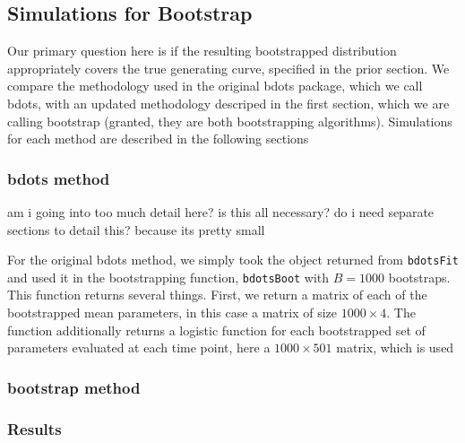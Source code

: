 \documentclass{article}
\begin{document}
\subsection{Simulations for Bootstrap}

Our primary question here is if the resulting bootstrapped distribution appropriately covers the true generating curve, specified in the prior section. We compare the methodology used in the original bdots package, which we call bdots, with an updated methodology descriped in the first section, which we are calling bootstrap (granted, they are both bootstrapping algorithms). Simulations for each method are described in the following sections

\subsubsection{bdots method}

am i going into too much detail here? is this all necessary? do i need separate sections to detail this? because its pretty small

For the original bdots method, we simply took the object returned from \texttt{bdotsFit} and used it in the bootstrapping function, \texttt{bdotsBoot} with $B = 1000$ bootstraps. This function returns several things. First, we return a matrix of each of the bootstrapped mean parameters, in this case a matrix of size $1000 \times 4$. The function additionally returns a logistic function for each bootstrapped set of parameters evaluated at each time point, here a $1000 \times 501$ matrix, which is used



\subsubsection{bootstrap method}

\subsubsection{Results}
\end{document}
